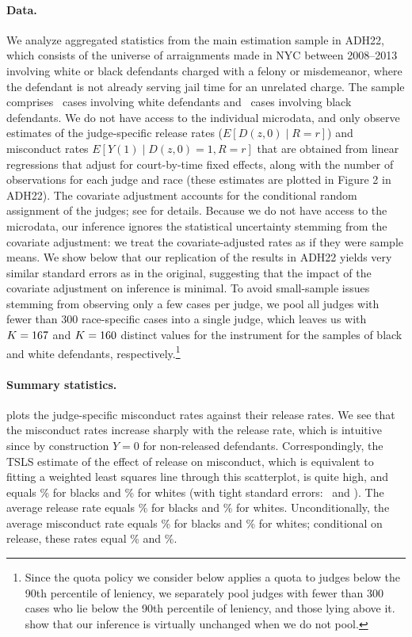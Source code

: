 \documentclass[12pt]{article}%
\theoremstyle{definition}
\newcommand\1{\operatorname{I}\indicatorfence}
\begin{document}
\paragraph{Data.} We analyze aggregated statistics from the main estimation
sample in ADH22, which consists of the universe of arraignments made in NYC
between 2008--2013 involving white or black defendants charged with a felony or
misdemeanor, where the defendant is not already serving jail time for an
unrelated charge. The sample comprises \nycNw\ cases involving white defendants
and \nycNb\ cases involving black defendants. We do not have access to the
individual microdata, and only observe estimates of the judge-specific release
rates ($E[D(z,0)\mid R=r]$) and misconduct rates $E[Y(1)\mid D(z,0)=1,R=r]$ that
are obtained from linear regressions that adjust for court-by-time fixed
effects, along with the number of observations for each judge and race (these
estimates are plotted in Figure 2 in ADH22). The covariate adjustment accounts
for the conditional random assignment of the judges; see  for details.
Because we do not have access to the microdata, our inference ignores the
statistical uncertainty stemming from the covariate adjustment: we treat the
covariate-adjusted rates as if they were sample means. We show below that our
replication of the results in ADH22 yields very similar standard errors as in
the original, suggesting that the impact of the covariate adjustment on
inference is minimal. To avoid small-sample issues stemming from observing only
a few cases per judge, we pool all judges with fewer than 300 race-specific
cases into a single judge, which leaves us with $K=167$ and
$K=160$ distinct values for the instrument for the samples of black and
white defendants, respectively.\footnote{Since the quota policy we consider
  below applies a quota to judges below the 90th percentile of leniency, we
  separately pool judges with fewer than 300 cases who lie below the 90th
  percentile of leniency, and those lying above it.
   show that our inference
  is virtually unchanged when we do not pool.}

\paragraph{Summary statistics.}

 plots the judge-specific misconduct rates against their
release rates. We see that the misconduct rates increase sharply with the
release rate, which is intuitive since by construction $Y=0$ for non-released
defendants. Correspondingly, the \ac{TSLS} estimate of the effect of release on
misconduct, which is equivalent to fitting a weighted least squares line through
this scatterplot, is quite high, and equals \nycIVb\% for blacks and \nycIVw\%
for whites (with tight standard errors: \nycIVbse\ and \nycIVwse). The
average release rate equals \nycEDb\% for blacks and \nycEDw\% for whites.
Unconditionally, the average misconduct rate equals \nycEYb\% for blacks and
\nycEYw\% for whites; conditional on release, these rates equal \nycEYbD\% and
\nycEYwD\%.
\end{document}
